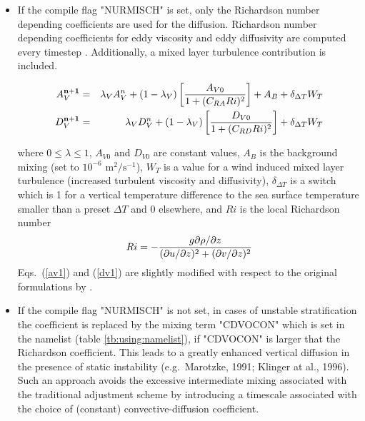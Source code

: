 \begin{itemize}
\item
If the compile flag  "NURMISCH" is set, only the  Richardson number depending coefficients are used for the diffusion.
Richardson number depending  coefficients for eddy viscosity and eddy diffusivity 
are computed every timestep \citep{pacanowski81}.
Additionally, a mixed layer turbulence contribution is included.

\begin{eqnarray}\label{av1}
A_V^{\bf n+1} &=& \lambda_V A_V^n + (1-\lambda_V)\left[ {A_{V0}\over{1+(C_{RA} Ri)^2}}
\right] + A_B+ \delta_{\Delta T} W_T \\ \label{dv1}
D_V^{\bf n+1} &=& \lambda_V D_V^n + (1-\lambda_V)\left[ {D_{V0}\over{1+(C_{RD} Ri)^2}}
\right] + \delta_{\Delta T} W_T
\end{eqnarray}

where $0 \leq \lambda \leq 1$, $A_{V0}$ and $D_{V0}$ are constant values,
$A_B$ is the background mixing (set to $10^{-6}\mbox{ m}^2/\mbox{s}^{-1}$),
 $W_T$ is a value for
a wind induced mixed layer turbulence (increased turbulent
viscosity and diffusivity), $\delta_{\Delta T}$ is a
switch which is 1 for a vertical temperature difference to the sea surface temperature smaller than a preset $\Delta T$
and 0 elsewhere, and $Ri$ is the local Richardson number
\begin{eqnarray}
Ri = - {{g\partial\rho/ \partial z}\over{(\partial  u/ \partial z)^2+(\partial v/ \partial z)^2}}
\end{eqnarray}
Eqs.\ (\ref{av1}) and (\ref{dv1}) are slightly modified with respect to
the original formulations by \citet{pacanowski81}.

\item
If the compile flag  "NURMISCH" is not set,
in cases of unstable stratification the coefficient is replaced by the mixing term "CDVOCON" which is set in the 
namelist (table \ref{tb:using:namelist}), if "CDVOCON" is larger that the Richardson coefficient.
This leads to a greatly enhanced vertical diffusion in the presence of static instability
(e.g.\ Marotzke, 1991; Klinger at al., 1996). \nocite{marotzke91,klinger96}
Such an approach avoids the excessive intermediate mixing associated with the traditional adjustment scheme
by introducing a timescale associated with the choice of (constant) convective-diffusion coefficient.
\end{itemize}

